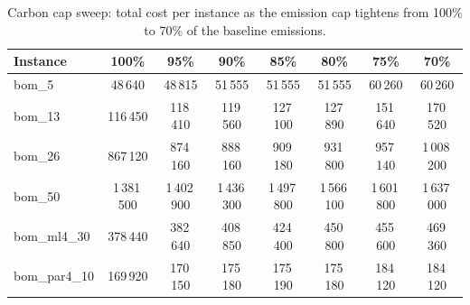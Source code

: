 \begin{table}[!htbp]\centering\scriptsize
\setlength{\tabcolsep}{3pt}
\caption{Carbon cap sweep: total cost per instance as the emission cap tightens from 100\% to 70\% of the baseline emissions.}\label{tab:cap}
\begin{tabular}{lccccccc}
\toprule
Instance & 100\% & 95\% & 90\% & 85\% & 80\% & 75\% & 70\%\\
\midrule
bom\_5 & 48\,640 & 48\,815 & 51\,555 & 51\,555 & 51\,555 & 60\,260 & 60\,260 \\
bom\_13 & 116\,450 & 118\,410 & 119\,560 & 127\,100 & 127\,890 & 151\,640 & 170\,520 \\
bom\_26 & 867\,120 & 874\,160 & 888\,160 & 909\,180 & 931\,800 & 957\,140 & 1\,008\,200 \\
bom\_50 & 1\,381\,500 & 1\,402\,900 & 1\,436\,300 & 1\,497\,800 & 1\,566\,100 & 1\,601\,800 & 1\,637\,000 \\
bom\_ml4\_30 & 378\,440 & 382\,640 & 408\,850 & 424\,400 & 450\,800 & 455\,600 & 469\,360 \\
bom\_par4\_10 & 169\,920 & 170\,150 & 175\,180 & 175\,190 & 175\,180 & 184\,120 & 184\,120 \\
\bottomrule
\end{tabular}
\end{table}
